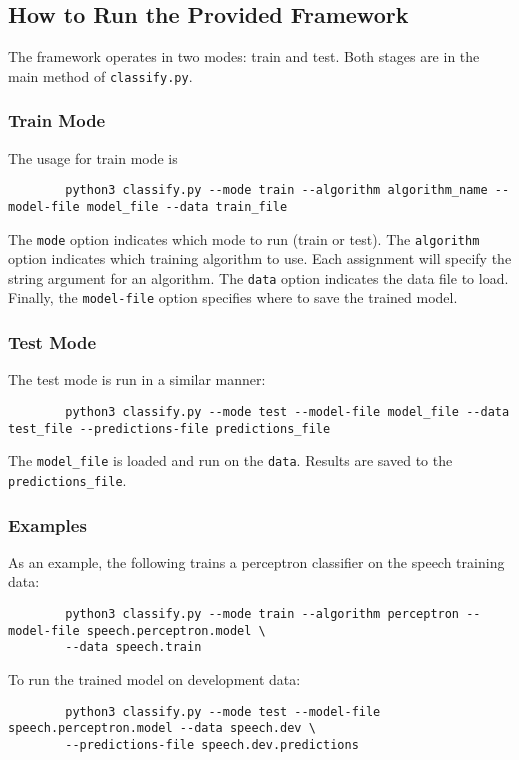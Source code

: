 \documentclass[11pt]{article}
\begin{document}
	\subsection{How to Run the Provided Framework}
	The framework operates in two modes: train and test. Both stages are in the main method of {\tt classify.py}.
	
	\subsubsection{Train Mode}
	The usage for train mode is
	\begin{footnotesize}
		\begin{verbatim}
		python3 classify.py --mode train --algorithm algorithm_name --model-file model_file --data train_file
		\end{verbatim}
	\end{footnotesize}
	The {\tt mode} option indicates which mode to run (train or test). The {\tt algorithm} option indicates which training algorithm to use. Each assignment will specify the string argument for an algorithm. The {\tt data} option indicates the data file to load. Finally, the {\tt model-file} option specifies where to save the trained model.
	
	\subsubsection{Test Mode}
	The test mode is run in a similar manner:
	\begin{footnotesize}
		\begin{verbatim}
		python3 classify.py --mode test --model-file model_file --data test_file --predictions-file predictions_file
		\end{verbatim}
	\end{footnotesize}
	The {\tt model\_file} is loaded and run on the {\tt data}. Results are saved to the {\tt predictions\_file}.
	
	\subsubsection{Examples}
	As an example, the following trains a perceptron classifier on the speech training data:
	\begin{footnotesize}
		\begin{verbatim}
		python3 classify.py --mode train --algorithm perceptron --model-file speech.perceptron.model \
		--data speech.train
		\end{verbatim}
	\end{footnotesize}
	To run the trained model on development data:
	\begin{footnotesize}
		\begin{verbatim}
		python3 classify.py --mode test --model-file speech.perceptron.model --data speech.dev \
		--predictions-file speech.dev.predictions
		\end{verbatim}
	\end{footnotesize}
	
\end{document}
